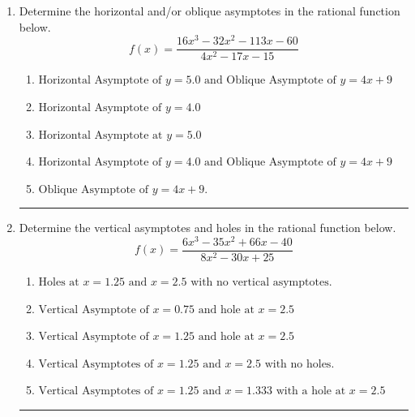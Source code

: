 \documentclass[14pt]{extbook}
\newcommand{\litem}[1]{\item#1\hspace*{-1cm}\rule{\textwidth}{0.4pt}}
\begin{document}
\begin{enumerate}
{\begin{enumerate}[label=\Alph*.]
\end{enumerate} }
\litem{
Determine the horizontal and/or oblique asymptotes in the rational function below.\[ f(x) = \frac{16x^{3} -32 x^{2} -113 x -60}{4x^{2} -17 x -15} \]\begin{enumerate}[label=\Alph*.]
\item \( \text{Horizontal Asymptote of } y = 5.0 \text{ and Oblique Asymptote of } y = 4x + 9 \)
\item \( \text{Horizontal Asymptote of } y = 4.0  \)
\item \( \text{Horizontal Asymptote at } y = 5.0 \)
\item \( \text{Horizontal Asymptote of } y = 4.0 \text{ and Oblique Asymptote of } y = 4x + 9 \)
\item \( \text{Oblique Asymptote of } y = 4x + 9. \)

\end{enumerate} }
\litem{
Determine the vertical asymptotes and holes in the rational function below.\[ f(x) = \frac{6x^{3} -35 x^{2} +66 x -40}{8x^{2} -30 x + 25} \]\begin{enumerate}[label=\Alph*.]
\item \( \text{Holes at } x = 1.25 \text{ and } x = 2.5 \text{ with no vertical asymptotes.} \)
\item \( \text{Vertical Asymptote of } x = 0.75 \text{ and hole at } x = 2.5 \)
\item \( \text{Vertical Asymptote of } x = 1.25 \text{ and hole at } x = 2.5 \)
\item \( \text{Vertical Asymptotes of } x = 1.25 \text{ and } x = 2.5 \text{ with no holes.} \)
\item \( \text{Vertical Asymptotes of } x = 1.25 \text{ and } x = 1.333 \text{ with a hole at } x = 2.5 \)

\end{enumerate} }
\end{enumerate}
\end{document}
